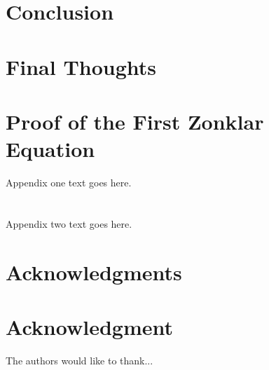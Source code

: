 \documentclass[10pt,journal,compsoc]{IEEEtran}
\begin{document}
\section{Conclusion}


\section{Final Thoughts}


\appendices
\section{Proof of the First Zonklar Equation}
Appendix one text goes here.

\section{}
Appendix two text goes here.


\ifCLASSOPTIONcompsoc
  \section*{Acknowledgments}
\else
  \section*{Acknowledgment}
\fi


The authors would like to thank...


\ifCLASSOPTIONcaptionsoff
  \newpage
\fi




\end{document}
